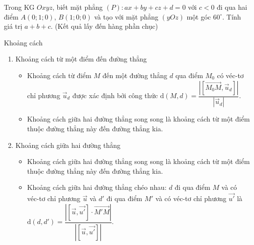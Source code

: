 \begin{ex}%
	Trong KG $Oxyz$, biết mặt phẳng $(P)\colon ax+by+cz+d=0$ với $c<0$ đi qua hai điểm $A(0;1;0)$, $B(1;0;0)$ và tạo với mặt phẳng $(yOz)$ một góc $60^\circ $. Tính giá trị $a+b+c$. (Kết quả lấy đến hàng phần chục)
\end{ex}
\begin{dang}{Khoảng cách}
	\begin{enumerate}
		\item Khoảng cách từ một điểm đến đường thẳng
		\begin{itemize}
			\item Khoảng cách từ điểm $M$ đến một đường thẳng $d$ qua điểm $M_{0}$ có véc-tơ chỉ phương $\overrightarrow{u}_d$ được xác định bởi công thức $\mathrm{d}(M, d)=\dfrac{\left|\left[\overrightarrow{M_0 M}, \vec{u}_d\right]\right|}{\left|\vec{u}_d\right|}$.
			\item Khoảng cách giữa hai đường thẳng song song là khoảng cách từ một điểm thuộc đường thẳng này đến đường thẳng kia.
		\end{itemize}
		\item Khoảng cách giữa hai đường thẳng
		\begin{itemize}
			\item Khoảng cách giữa hai đường thẳng song song là khoảng cách từ một điểm thuộc đường thẳng này đến đường thẳng kia.
			\item Khoảng cách giữa hai đường thẳng chéo nhau: $d$ đi qua điểm $M$ và có véc-tơ chỉ phương $\overrightarrow{u}$ và $d'$ đi qua điểm $M'$ và có véc-tơ chỉ phương $\overrightarrow{u'}$ là $\mathrm{d}\left(d, d'\right)=\dfrac{\left|\left[\vec{u}, \vec{u'}\right] \cdot \overrightarrow{M'M}\right|}{\left|\left[\vec{u}, \vec{u'}\right]\right|}$.
		\end{itemize}
	\end{enumerate}
\end{dang}
